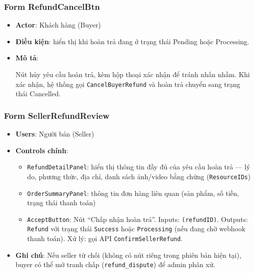 \subsubsection{Form RefundCancelBtn}
\label{subsubsec:form-refund-cancel}

\begin{itemize}[leftmargin=*]
  \item \textbf{Actor}: Khách hàng (Buyer)
  \item \textbf{Điều kiện}: hiển thị khi hoàn trả đang ở trạng thái Pending hoặc Processing.
  \item \textbf{Mô tả}:

Nút hủy yêu cầu hoàn trả, kèm hộp thoại xác nhận để tránh nhấn nhầm. Khi xác nhận, hệ thống gọi \texttt{CancelBuyerRefund} và hoàn trả chuyển sang trạng thái Cancelled.
\end{itemize}

\subsubsection{Form SellerRefundReview}
\label{subsubsec:form-seller-refund-review}

\begin{itemize}[leftmargin=*]
  \item \textbf{Users}: Người bán (Seller)
  \item \textbf{Controls chính}:
    \begin{itemize}
      \item \texttt{RefundDetailPanel}: hiển thị thông tin đầy đủ của yêu cầu hoàn trả — lý do, phương thức, địa chỉ, danh sách ảnh/video bằng chứng (\texttt{ResourceIDs})
      \item \texttt{OrderSummaryPanel}: thông tin đơn hàng liên quan (sản phẩm, số tiền, trạng thái thanh toán)
      \item \texttt{AcceptButton}: Nút ``Chấp nhận hoàn trả''. Inputs: \texttt{(refundID)}. Outputs: \texttt{Refund} với trạng thái \texttt{Success} hoặc \texttt{Processing} (nếu đang chờ webhook thanh toán). Xử lý: gọi API \texttt{ConfirmSellerRefund}.
    \end{itemize}
  \item \textbf{Ghi chú}: Nếu seller từ chối (không có nút riêng trong phiên bản hiện tại), buyer có thể mở tranh chấp (\texttt{refund\_dispute}) để admin phân xử.
\end{itemize}

